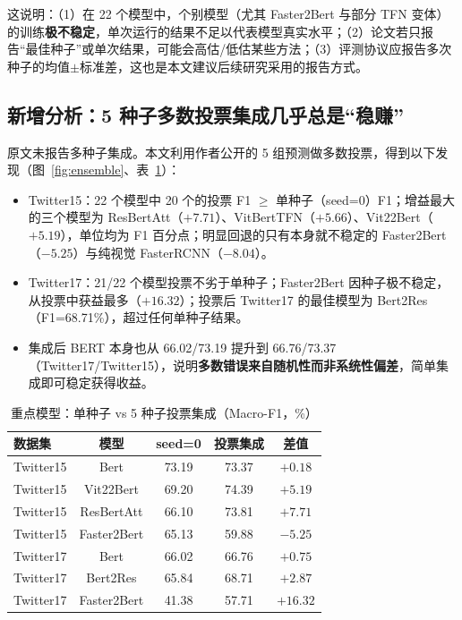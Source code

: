 \documentclass[11pt]{ctexart}
\begin{document}
这说明：（1）在 22 个模型中，个别模型（尤其 Faster2Bert 与部分 TFN 变体）的训练\textbf{极不稳定}，单次运行的结果不足以代表模型真实水平；（2）论文若只报告“最佳种子”或单次结果，可能会高估/低估某些方法；（3）评测协议应报告多次种子的均值$\pm$标准差，这也是本文建议后续研究采用的报告方式。

\subsection{新增分析：5 种子多数投票集成几乎总是“稳赚”}

原文未报告多种子集成。本文利用作者公开的 5 组预测做多数投票，得到以下发现（图~\ref{fig:ensemble}、表~\ref{tab:vote}）：
\begin{itemize}
  \item Twitter15：22 个模型中 20 个的投票 F1 $\geq$ 单种子（seed=0）F1；增益最大的三个模型为 ResBertAtt（$+7.71$）、VitBertTFN（$+5.66$）、Vit22Bert（$+5.19$），单位均为 F1 百分点；明显回退的只有本身就不稳定的 Faster2Bert（$-5.25$）与纯视觉 FasterRCNN（$-8.04$）。
  \item Twitter17：21/22 个模型投票不劣于单种子；Faster2Bert 因种子极不稳定，从投票中获益最多（$+16.32$）；投票后 Twitter17 的最佳模型为 Bert2Res（F1=68.71\%），超过任何单种子结果。
  \item 集成后 BERT 本身也从 66.02/73.19 提升到 66.76/73.37（Twitter17/Twitter15），说明\textbf{多数错误来自随机性而非系统性偏差}，简单集成即可稳定获得收益。
\end{itemize}

\begin{table}[htbp]
\centering
\caption{重点模型：单种子 vs 5 种子投票集成（Macro-F1，\%）}\label{tab:vote}
\footnotesize
\begin{tabular}{lcccc}
\toprule
数据集 & 模型 & seed=0 & 投票集成 & 差值 \\
\midrule
Twitter15 & Bert & 73.19 & 73.37 & $+0.18$ \\
Twitter15 & Vit22Bert & 69.20 & 74.39 & $+5.19$ \\
Twitter15 & ResBertAtt & 66.10 & 73.81 & $+7.71$ \\
Twitter15 & Faster2Bert & 65.13 & 59.88 & $-5.25$ \\
Twitter17 & Bert & 66.02 & 66.76 & $+0.75$ \\
Twitter17 & Bert2Res & 65.84 & 68.71 & $+2.87$ \\
Twitter17 & Faster2Bert & 41.38 & 57.71 & $+16.32$ \\
\bottomrule
\end{tabular}
\end{table}
\end{document}
